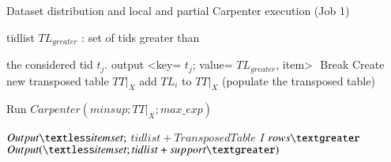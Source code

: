 \begin{algorithm}[H]
\scriptsize
\centering

\caption{Dataset distribution and local and partial Carpenter execution (Job 1)}
 \label{job1}
 \begin{algorithmic}[1]
 \par tidlist $TL_{greater}$ : set of tids greater than \par the considered tid
$t_{j}$.
 \State output \textless key= $t_{j}$; value= $TL_{greater}$, item\textgreater
 \Else $ $ Break
 \EndIf
\EndFor
\EndProcedure
\State Create new transposed table $ TT|_{X} $
\State  add $TL_{i}$ to $ TT|_{X} $ (populate the transposed table)
\EndFor

\State Run $Carpenter (minsup;  TT|_{X}; max\_exp)$ 

\State $Output \textless itemset;$ $tidlist+Transposed
Table$ $I$ $rows  \textgreater$
\EndFor
{}
\State $Output(  \textless itemset;tidlist+support \textgreater) $
\EndFor
 \EndProcedure
 \end{algorithmic}
\end{algorithm}

